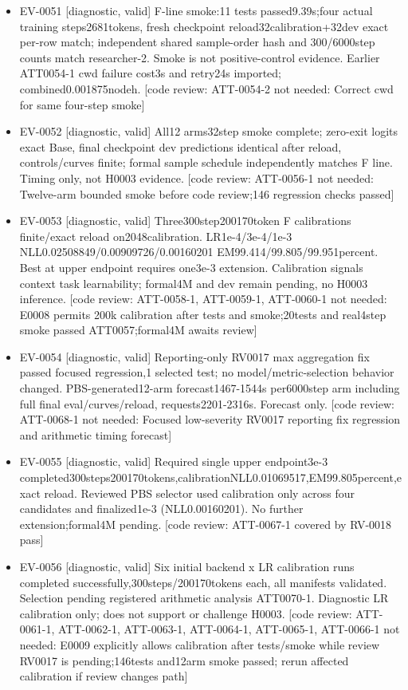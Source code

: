 \documentclass[11pt]{article}
\begin{document}
\begin{itemize}
\item EV-0051 [diagnostic, valid] F-line smoke:11 tests passed9.39s;four actual training steps2681tokens, fresh checkpoint reload32calibration+32dev exact per-row match; independent shared sample-order hash and 300/6000step counts match researcher-2. Smoke is not positive-control evidence. Earlier ATT0054-1 cwd failure cost3s and retry24s imported; combined0.001875nodeh. [code review: ATT-0054-2 not needed: Correct cwd for same four-step smoke]
\item EV-0052 [diagnostic, valid] All12 arms32step smoke complete; zero-exit logits exact Base, final checkpoint dev predictions identical after reload, controls/curves finite; formal sample schedule independently matches F line. Timing only, not H0003 evidence. [code review: ATT-0056-1 not needed: Twelve-arm bounded smoke before code review;146 regression checks passed]
\item EV-0053 [diagnostic, valid] Three300step200170token F calibrations finite/exact reload on2048calibration. LR1e-4/3e-4/1e-3 NLL0.02508849/0.00909726/0.00160201 EM99.414/99.805/99.951percent. Best at upper endpoint requires one3e-3 extension. Calibration signals context task learnability; formal4M and dev remain pending, no H0003 inference. [code review: ATT-0058-1, ATT-0059-1, ATT-0060-1 not needed: E0008 permits 200k calibration after tests and smoke;20tests and real4step smoke passed ATT0057;formal4M awaits review]
\item EV-0054 [diagnostic, valid] Reporting-only RV0017 max aggregation fix passed focused regression,1 selected test; no model/metric-selection behavior changed. PBS-generated12-arm forecast1467-1544s per6000step arm including full final eval/curves/reload, requests2201-2316s. Forecast only. [code review: ATT-0068-1 not needed: Focused low-severity RV0017 reporting fix regression and arithmetic timing forecast]
\item EV-0055 [diagnostic, valid] Required single upper endpoint3e-3 completed300steps200170tokens,calibrationNLL0.01069517,EM99.805percent,exact reload. Reviewed PBS selector used calibration only across four candidates and finalized1e-3 (NLL0.00160201). No further extension;formal4M pending. [code review: ATT-0067-1 covered by RV-0018 pass]
\item EV-0056 [diagnostic, valid] Six initial backend x LR calibration runs completed successfully,300steps/200170tokens each, all manifests validated. Selection pending registered arithmetic analysis ATT0070-1. Diagnostic LR calibration only; does not support or challenge H0003. [code review: ATT-0061-1, ATT-0062-1, ATT-0063-1, ATT-0064-1, ATT-0065-1, ATT-0066-1 not needed: E0009 explicitly allows calibration after tests/smoke while review RV0017 is pending;146tests and12arm smoke passed; rerun affected calibration if review changes path]

\end{itemize}
\end{document}
